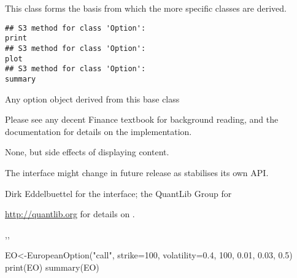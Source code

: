\begin{Description}\relax
This class forms the basis from which the more specific classes are
derived.
\end{Description}
\begin{Usage}
\begin{verbatim}
## S3 method for class 'Option':
print
## S3 method for class 'Option':
plot
## S3 method for class 'Option':
summary
\end{verbatim}
\end{Usage}
\begin{Arguments}
\begin{ldescription}
\item[\code{Option}] Any option object derived from this base class
\end{ldescription}
\end{Arguments}
\begin{Details}\relax
Please see any decent Finance textbook for background reading, and the
 documentation for details on the 
implementation.
\end{Details}
\begin{Value}
None, but side effects of displaying content.
\end{Value}
\begin{Note}\relax
The interface might change in future release as 
stabilises its own API.
\end{Note}
\begin{Author}\relax
Dirk Eddelbuettel  for the \R{} interface;
the QuantLib Group for 
\end{Author}
\begin{References}\relax
\url{http://quantlib.org} for details on .
\end{References}
\begin{SeeAlso}\relax
{},,
\end{SeeAlso}
\begin{Examples}
\begin{ExampleCode}
EO<-EuropeanOption("call", strike=100, volatility=0.4, 100, 0.01, 0.03, 0.5)
print(EO)
summary(EO)
\end{ExampleCode}
\end{Examples}

